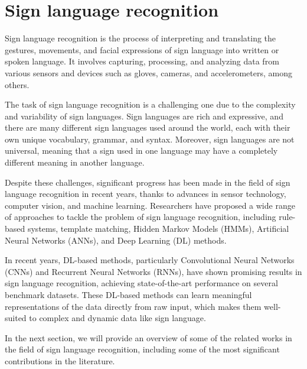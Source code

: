 \section{Sign language recognition}
Sign language recognition is the process of interpreting and translating the gestures, movements, and facial expressions of sign language into written or spoken language. It involves capturing, processing, and analyzing data from various sensors and devices such as gloves, cameras, and accelerometers, among others.

The task of sign language recognition is a challenging one due to the complexity and variability of sign languages. Sign languages are rich and expressive, and there are many different sign languages used around the world, each with their own unique vocabulary, grammar, and syntax. Moreover, sign languages are not universal, meaning that a sign used in one language may have a completely different meaning in another language.

Despite these challenges, significant progress has been made in the field of sign language recognition in recent years, thanks to advances in sensor technology, computer vision, and machine learning. Researchers have proposed a wide range of approaches to tackle the problem of sign language recognition, including rule-based systems, template matching, Hidden Markov Models (HMMs), Artificial Neural Networks (ANNs), and Deep Learning (DL) methods.

In recent years, DL-based methods, particularly Convolutional Neural Networks (CNNs) and Recurrent Neural Networks (RNNs), have shown promising results in sign language recognition, achieving state-of-the-art performance on several benchmark datasets. These DL-based methods can learn meaningful representations of the data directly from raw input, which makes them well-suited to complex and dynamic data like sign language.

In the next section, we will provide an overview of some of the related works in the field of sign language recognition, including some of the most significant contributions in the literature.